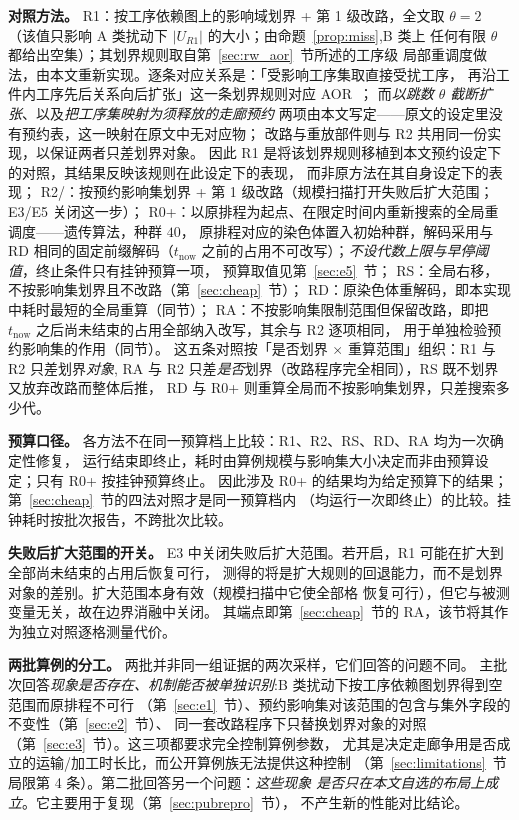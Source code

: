 \textbf{对照方法。}
R1：按工序依赖图上的影响域划界 + 第 1 级改路，全文取 \(\theta=2\)
（该值只影响 A 类扰动下 \(|U_{R1}|\) 的大小；由命题~\ref{prop:miss},B 类上
任何有限 \(\theta\) 都给出空集）；其划界规则取自第~\ref{sec:rw_aor}~节所述的工序级
局部重调度做法，由本文重新实现。逐条对应关系是：「受影响工序集取直接受扰工序，
再沿工件内工序先后关系向后扩张」这一条划界规则对应
AOR~\cite{abumaizar1997rescheduling,subramaniam2003maor}；
而\emph{以跳数 \(\theta\) 截断扩张}、以及\emph{把工序集映射为须释放的走廊预约}
两项由本文写定——原文的设定里没有预约表，这一映射在原文中无对应物；
改路与重放部件则与 R2 共用同一份实现，以保证两者只差划界对象。
因此 R1 是将该划界规则移植到本文预约设定下的对照，其结果反映该规则在此设定下的表现，
而非原方法在其自身设定下的表现；
R2/\STRC：按预约影响集划界 + 第 1 级改路（规模扫描打开失败后扩大范围；E3/E5 关闭这一步）；
R0+：以原排程为起点、在限定时间内重新搜索的全局重调度——遗传算法，种群 \(40\)，
原排程对应的染色体置入初始种群，解码采用与 RD 相同的固定前缀解码（\(t_{\mathrm{now}}\)
之前的占用不可改写）；\emph{不设代数上限与早停阈值}，终止条件只有挂钟预算一项，
预算取值见第~\ref{sec:e5}~节；
RS：全局右移，不按影响集划界且不改路（第~\ref{sec:cheap}~节）；
RD：原染色体重解码，即本实现中耗时最短的全局重算（同节）；
RA：不按影响集限制范围但保留改路，即把 \(t_{\mathrm{now}}\) 之后尚未结束的占用全部纳入改写，其余与 R2 逐项相同，
用于单独检验预约影响集的作用（同节）。
这五条对照按「是否划界 \(\times\) 重算范围」组织：R1 与 R2 只差划界\emph{对象},
RA 与 R2 只差\emph{是否}划界（改路程序完全相同），RS 既不划界又放弃改路而整体后推，
RD 与 R0+ 则重算全局而不按影响集划界，只差搜索多少代。

\textbf{预算口径。}
各方法不在同一预算档上比较：R1、R2、RS、RD、RA 均为一次确定性修复，
运行结束即终止，耗时由算例规模与影响集大小决定而非由预算设定；只有 R0+ 按挂钟预算终止。
因此涉及 R0+ 的结果均为给定预算下的结果；第~\ref{sec:cheap}~节的四法对照才是同一预算档内
（均运行一次即终止）的比较。挂钟耗时按批次报告，不跨批次比较。

\textbf{失败后扩大范围的开关。}
E3 中关闭失败后扩大范围。若开启，R1 可能在扩大到全部尚未结束的占用后恢复可行，
测得的将是扩大规则的回退能力，而不是划界对象的差别。扩大范围本身有效（规模扫描中它使全部格
恢复可行），但它与被测变量无关，故在边界消融中关闭。
其端点即第~\ref{sec:cheap}~节的 RA，该节将其作为独立对照逐格测量代价。

\textbf{两批算例的分工。}
两批并非同一组证据的两次采样，它们回答的问题不同。
主批次回答\emph{现象是否存在、机制能否被单独识别}:B 类扰动下按工序依赖图划界得到空范围而原排程不可行
（第~\ref{sec:e1}~节）、预约影响集对该范围的包含与集外字段的不变性（第~\ref{sec:e2}~节）、
同一套改路程序下只替换划界对象的对照（第~\ref{sec:e3}~节）。这三项都要求完全控制算例参数，
尤其是决定走廊争用是否成立的运输/加工时长比，而公开算例族无法提供这种控制
（第~\ref{sec:limitations}~节局限第 4 条）。第二批回答另一个问题：\emph{这些现象
是否只在本文自选的布局上成立}。它主要用于复现（第~\ref{sec:pubrepro}~节），
不产生新的性能对比结论。

